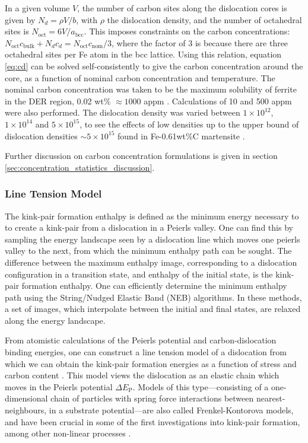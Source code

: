 \documentclass[a4paper,11pt]{article}
\numberwithin{equation}{chapter}
\numberwithin{listing}{chapter}
\begin{document}
In a given volume \(V\), the number of carbon sites along the dislocation
cores is given by \(N_d = \rho V/b\), with \(\rho\) the dislocation density, and
the number of octahedral sites is \(N_{\text{oct}} = 6V/a_{\text{bcc}}\). This
imposes constraints on the carbon concentrations: \(N_{\text{oct}}
    c_{\text{bulk}} + N_d c_d = N_{\text{oct}} c_{\text{nom}}/3\), where the
factor of 3 is because there are three octahedral sites per Fe atom in the
bcc lattice. Using this relation, equation \eqref{eq:cd} can be solved
self-consistently to give the carbon concentration around the core, as a
function of nominal carbon concentration and temperature. The nominal carbon
concentration was taken to be the maximum solubility of ferrite in the DER
region, 0.02 wt\% \(\approx 1000\) appm
\cite{hashemi11_stren_hardn_statis_correl_api_x65_steel}. Calculations of 10
and 500 appm were also performed. The dislocation density was varied between
\(1\times10^{12}\), \(1\times10^{14}\) and \(5\times10^{15}\), to see the effects
of low densities up to the upper bound of dislocation densities
\(\sim5\times10^{15}\) found in Fe-0.61wt\%C martensite
\cite{morito03_disloc_densit_within_lath_marten}.


Further discussion on carbon concentration formulations is given in section
\ref{sec:concentration_statistics_discussion}.

\subsubsection{Line Tension Model}
\label{sec:orga5d2e52}
\label{sec:ltmodelintro}

The kink-pair formation enthalpy is defined as the minimum energy necessary to to
create a kink-pair from a dislocation in a Peierls valley. One can find this by
sampling the energy landscape seen by a dislocation line which moves one peierls
valley to the next, from which the minimum enthalpy path can be sought. The difference
between the maximum enthalpy image, corresponding to a dislocation configuration in a
transition state, and enthalpy of the initial state, is the kink-pair
formation enthalpy. One can efficiently determine the minimum enthalpy path using the
String/Nudged Elastic Band (NEB) algorithms. In these methods, a set of images, which
interpolate between the initial and final states, are relaxed along the energy
landscape.


From atomistic calculations of the Peierls potential and carbon-dislocation binding energies, one
can construct a line tension model of a dislocation from which we can obtain the kink-pair
formation energies as a function of stress and carbon content
\cite{Anderson2017,Itakura2012,itakura13_effec_hydrog_atoms_screw_disloc}. This model views the
dislocation as an elastic chain which moves in the Peierls potential \(\Delta
   E_{\text{P}}\). Models of this type---consisting of a one-dimensional chain of particles with
spring force interactions between nearest-neighbours, in a substrate potential---are also called
Frenkel-Kontorova models, and have been crucial in some of the first investigations into
kink-pair formation, among other non-linear processes \cite{Braun1998,Kontorova1938,Frenkel1939,Rodney2009}.
\end{document}
